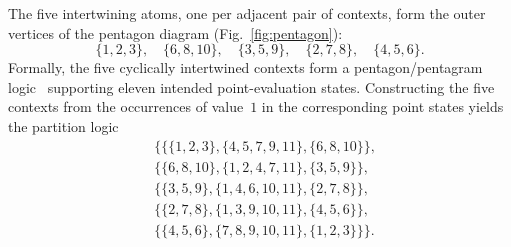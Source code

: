 \documentclass[aps,pra,twocolumn,superscriptaddress,floatfix,longbibliography]{revtex4-2}
\begin{document}
The five intertwining atoms, one per adjacent pair of contexts, form
the outer vertices of the pentagon diagram (Fig.~\ref{fig:pentagon}):
\[
\{1,2,3\},\quad
\{6,8,10\},\quad
\{3,5,9\},\quad
\{2,7,8\},\quad
\{4,5,6\}.
\]
Formally, the five cyclically intertwined contexts form a
pentagon/pentagram logic~\cite[p.~267, Fig.~2]{wright:pent}
supporting eleven intended point-evaluation states. Constructing the
five contexts from the occurrences of value~$1$ in the corresponding
point states yields the partition logic
\begin{equation}
\begin{aligned}
&\{
 \{ \{ 1,2,3\} ,\{ 4,5,7,9,11\} ,\{ 6,8,10\} \} ,\\
&\{ \{ 6,8,10\} ,\{ 1,2,4,7,11\} ,\{ 3,5,9\} \} ,\\
&\{ \{ 3,5,9\} ,\{ 1,4,6,10,11\} ,\{ 2,7,8\} \} ,\\
&\{ \{ 2,7,8\} ,\{ 1,3,9,10,11\} ,\{ 4,5,6\} \} ,\\
&\{ \{ 4,5,6\} ,\{ 7,8,9,10,11\} ,\{ 1,2,3\} \}
\}.
\end{aligned}
\label{2018-e-plpentagon}
\end{equation}
\end{document}
